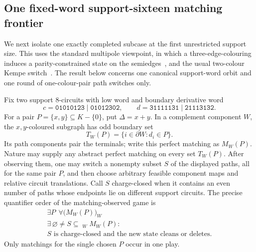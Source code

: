 \documentclass[11pt]{article}
\theoremstyle{definition}
\theoremstyle{remark}
\begin{document}
\subsection{One fixed-word support-sixteen matching frontier}

We next isolate one exactly completed subcase at the first unrestricted
support size.  This uses the standard multipole viewpoint, in which a
three-edge-colouring induces a parity-constrained state on the
semiedges~\cite{FiolVilaltella2015}, and the usual two-colour Kempe
switch~\cite{BelcastroHaas2012}.  The result below concerns one
canonical support-word orbit and one round of one-colour-pair path
switches only.

Fix two support \(8\)-circuits with low word and boundary derivative word
\[
 c=\texttt{01010123}\mid\texttt{01012302},\qquad
 d=\texttt{31111131}\mid\texttt{21113132}.               \tag{26o}
\]
For a pair \(P=\{x,y\}\subseteq K-\{0\}\), put
\(\Delta=x+y\).  In a complement component \(W\), the \(x,y\)-coloured
subgraph has odd boundary set
\[
                 T_W(P)=\{i\in\partial W:d_i\in P\}.      \tag{26p}
\]
Its path components pair the terminals; write this perfect matching as
\(M_W(P)\).  Nature may supply any abstract perfect matching on every
set \(T_W(P)\).  After observing them, one may switch a nonempty subset
\(S\) of the displayed paths, all for the same pair \(P\), and then
choose arbitrary feasible component maps and relative circuit
translations.  Call \(S\) charge-closed when it contains an even number
of paths whose endpoints lie on different support circuits.  The precise
quantifier order of the matching-observed game is
\[
\boxed{
\begin{gathered}
\exists P\ \ \forall\bigl(M_W(P)\bigr)_W\\
\exists\,\varnothing\ne S\subseteq\mathop{\dot\bigcup}_W M_W(P):\\
S\text{ is charge-closed and the new state cleans or deletes}.
\end{gathered}
}                                                          \tag{26q}
\]
Only matchings for the single chosen \(P\) occur in one play.
\end{document}
